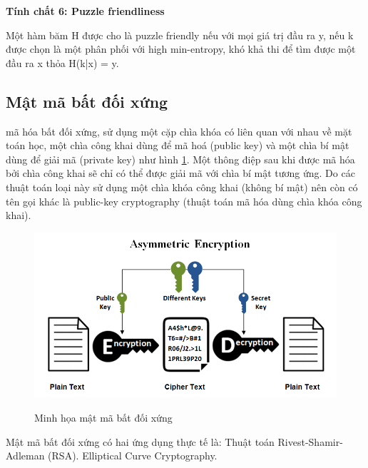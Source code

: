 {\textbf{Tính chất 6: Puzzle friendliness}

Một hàm băm H được cho là puzzle friendly nếu với mọi giá trị đầu ra y, nếu k được chọn là một phân phối với  high min-entropy, khó khả thi để tìm được một đầu ra x thỏa H(k|x) = y.


%
%
%
%
%
%
%

\subsection{Mật mã bất đối xứng}

mã hóa bất đối xứng, sử dụng một cặp chìa khóa có liên quan với nhau về mặt toán học, một chìa công khai dùng để mã hoá (public key) và một chìa bí mật dùng để giải mã (private key) như hình \ref{fig:asymmetric}. Một thông điệp sau khi được mã hóa bởi chìa công khai sẽ chỉ có thể được giải mã với chìa bí mật tương ứng. Do các thuật toán loại này sử dụng một chìa khóa công khai (không bí mật) nên còn có tên gọi khác là public-key cryptography (thuật toán mã hóa dùng chìa khóa công khai).
 \begin{figure}[ht]
	\centering
	\includegraphics[width=0.9\linewidth]{image/asymmetric_cryptography}\label{fig:asymmetric}
	\caption{Minh họa mật mã bất đối xứng}
\end{figure}


Mật mã bất đối xứng có hai ứng dụng thực tế là:
Thuật toán Rivest-Shamir-Adleman (RSA).
Elliptical Curve Cryptography.}

